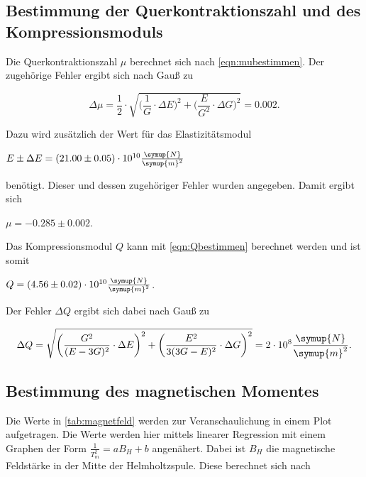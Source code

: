 \subsection{Bestimmung der Querkontraktionszahl und des Kompressionsmoduls}

Die Querkontraktionszahl $\mu$ berechnet sich nach \eqref{eqn:mubestimmen}. Der zugehörige Fehler ergibt sich nach Gauß zu

\begin{equation}
  \Delta \mu = \frac{1}{2} \cdot \sqrt{ \bigg( \frac{1}{G} \cdot \Delta E \bigg)^2 + \bigg( \frac{E}{G^2} \cdot \Delta G \bigg)^2} = 0.002.
\end{equation}

Dazu wird zusätzlich der Wert für das Elastizitätsmodul 

\vspace{.5em}
\centerline{$E \pm \Delta E = (21.00 \pm 0.05) \cdot 10^{10} \frac{\symup{N}}{\symup{m}^2}$}
\vspace{.5em}

benötigt. Dieser und dessen zugehöriger Fehler wurden angegeben. Damit ergibt sich 

\centerline{$\mu = -0.285 \pm 0.002$.}
Das Kompressionsmodul $Q$ kann mit \eqref{eqn:Qbestimmen} berechnet werden und ist somit

\vspace{.5em}
\centerline{$Q = (4.56 \pm 0.02) \cdot 10^{10} \frac{\symup{N}}{\symup{m}^2}$.}
\vspace{.5em}

Der Fehler $\Delta Q$ ergibt sich dabei nach Gauß zu

\begin{equation}
  \Delta Q = \sqrt{ \bigg( \frac{G^2}{(E - 3G)^2} \cdot \Delta E \bigg)^2 + \bigg( \frac{E^2}{3(3G - E)^2} \cdot \Delta G \bigg)^2} = 2 \cdot 10^{8} \frac{\symup{N}}{\symup{m}^2}.
\end{equation}


\subsection{Bestimmung des magnetischen Momentes}



Die Werte in \autoref{tab:magnetfeld} werden zur Veranschaulichung in einem Plot aufgetragen. Die Werte werden hier mittels linearer Regression mit einem Graphen der Form $\frac{1}{T_m^2} = aB_H + b$ angenähert.
Dabei ist $B_H$ die magnetische Feldstärke in der Mitte der Helmholtzspule. Diese berechnet sich nach

